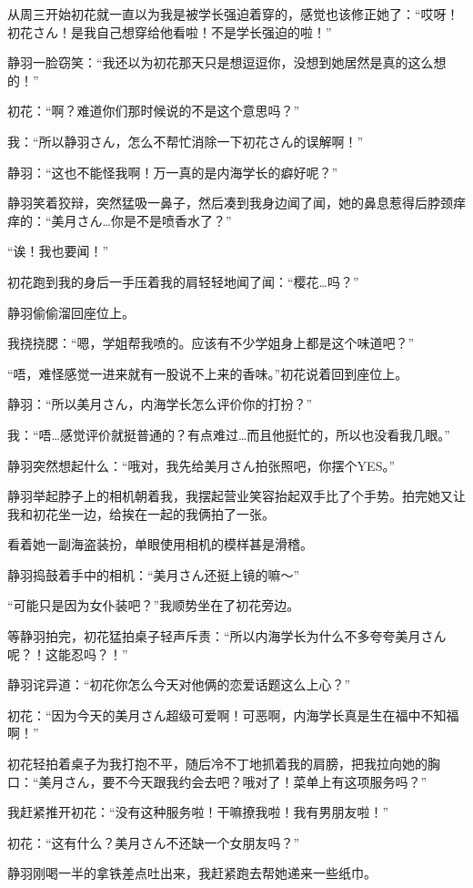 从周三开始初花就一直以为我是被学长强迫着穿的，感觉也该修正她了：“哎呀！初花さん！是我自己想穿给他看啦！不是学长强迫的啦！”

静羽一脸窃笑：“我还以为初花那天只是想逗逗你，没想到她居然是真的这么想的！”

初花：“啊？难道你们那时候说的不是这个意思吗？”

我：“所以静羽さん，怎么不帮忙消除一下初花さん的误解啊！”

静羽：“这也不能怪我啊！万一真的是内海学长的癖好呢？”

静羽笑着狡辩，突然猛吸一鼻子，然后凑到我身边闻了闻，她的鼻息惹得后脖颈痒痒的：“美月さん…你是不是喷香水了？”

“诶！我也要闻！”

初花跑到我的身后一手压着我的肩轻轻地闻了闻：“樱花…吗？”

静羽偷偷溜回座位上。

我挠挠腮：“嗯，学姐帮我喷的。应该有不少学姐身上都是这个味道吧？”

“唔，难怪感觉一进来就有一股说不上来的香味。”初花说着回到座位上。

静羽：“所以美月さん，内海学长怎么评价你的打扮？”

我：“唔…感觉评价就挺普通的？有点难过…而且他挺忙的，所以也没看我几眼。”

静羽突然想起什么：“哦对，我先给美月さん拍张照吧，你摆个YES。”

静羽举起脖子上的相机朝着我，我摆起营业笑容抬起双手比了个手势。拍完她又让我和初花坐一边，给挨在一起的我俩拍了一张。

看着她一副海盗装扮，单眼使用相机的模样甚是滑稽。

静羽捣鼓着手中的相机：“美月さん还挺上镜的嘛～”

“可能只是因为女仆装吧？”我顺势坐在了初花旁边。

等静羽拍完，初花猛拍桌子轻声斥责：“所以内海学长为什么不多夸夸美月さん呢？！这能忍吗？！”

静羽诧异道：“初花你怎么今天对他俩的恋爱话题这么上心？”

初花：“因为今天的美月さん超级可爱啊！可恶啊，内海学长真是生在福中不知福啊！”

初花轻拍着桌子为我打抱不平，随后冷不丁地抓着我的肩膀，把我拉向她的胸口：“美月さん，要不今天跟我约会去吧？哦对了！菜单上有这项服务吗？”

我赶紧推开初花：“没有这种服务啦！干嘛撩我啦！我有男朋友啦！”

初花：“这有什么？美月さん不还缺一个女朋友吗？”

静羽刚喝一半的拿铁差点吐出来，我赶紧跑去帮她递来一些纸巾。

